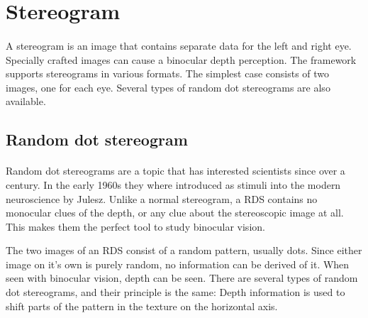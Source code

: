 \section{Stereogram}
\paragraph{}
A stereogram is an image that contains separate data for the left and right eye. Specially crafted images can cause a binocular depth perception. The framework supports stereograms in various formats. The simplest case consists of two images, one for each eye. Several types of random dot stereograms are also available.

\subsection{Random dot stereogram}
\paragraph{}
Random dot stereograms are a topic that has interested scientists since over a century\cite{AntRDS}. In the early 1960s they where introduced as stimuli into the modern neuroscience by Julesz\cite{BellRDS}. Unlike a normal stereogram, a RDS contains no monocular clues of the depth, or any clue about the stereoscopic image at all. This makes them the perfect tool to study binocular vision.

The two images of an RDS consist of a random pattern, usually dots. Since either image on it's own is purely random, no information can be derived of it. When seen with binocular vision, depth can be seen. There are several types of random dot stereograms, and their principle is the same: Depth information is used to shift parts of the pattern in the texture on the horizontal axis.